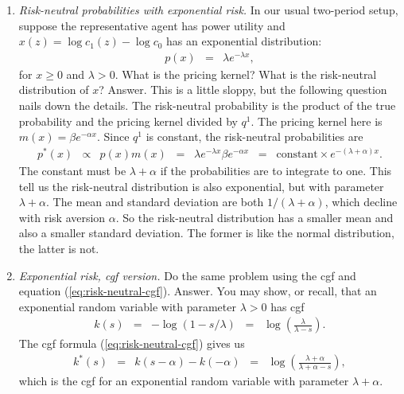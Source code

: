 \documentclass[11pt]{article}
\begin{document}
\begin{enumerate}
\begin{enumerate}
\end{enumerate}


\item {\it Risk-neutral probabilities with exponential risk.\/}
In our usual two-period setup, suppose the representative agent
has power utility and
$x(z) = \log c_1(z) - \log c_0 $ has an exponential distribution:
\begin{eqnarray*}
    p(x) &=& \lambda e^{-\lambda x} ,
\end{eqnarray*}
for $x \geq 0$ and $\lambda > 0$.
What is the pricing kernel?
What is the risk-neutral distribution of $x$?
%
Answer.
This is a little sloppy, but the following question nails down the details.
The risk-neutral probability is
the product of the true probability and the pricing kernel divided by $q^1$.
The pricing kernel here is $  m(x) = \beta e^{-\alpha x} $.
Since $q^1$ is constant, the risk-neutral probabilities are
\begin{eqnarray*}
    p^*(x) &\propto& p(x) m(x)
        \;\;=\;\; \lambda e^{-\lambda x} \beta e^{-\alpha x}
                \;\;=\;\; \mbox{constant} \times e^{-(\lambda + \alpha) x} .
\end{eqnarray*}
The constant must be $\lambda + \alpha$ if the probabilities are
to integrate to one.
This tell us the risk-neutral distribution is also exponential,
but with parameter $\lambda + \alpha$.
The mean and standard deviation are both $1/(\lambda+\alpha)$,
which decline with risk aversion $\alpha$.
So the risk-neutral distribution has a smaller mean
and also a smaller standard deviation.
The former is like the normal distribution, the latter is not.

\item {\it Exponential risk, cgf version.\/}
Do the same problem using the cgf and equation (\ref{eq:risk-neutral-cgf}).
%
Answer.  You may show, or recall,
that an exponential random variable with parameter $\lambda>0$
has cgf
\begin{eqnarray*}
    k(s) &=& - \log (1-s/\lambda) \;\;=\;\; \log \left( \frac{\lambda}{\lambda - s}\right).
\end{eqnarray*}
The cgf formula (\ref{eq:risk-neutral-cgf}) gives us
\begin{eqnarray*}
    k^*(s) &=& k(s-\alpha) - k(-\alpha)
            \;\;=\;\; \log \left( \frac{\lambda+\alpha}{\lambda+\alpha - s}\right),
\end{eqnarray*}
which is the cgf for an exponential random variable with parameter $\lambda + \alpha$.


\end{enumerate}
\end{document}
